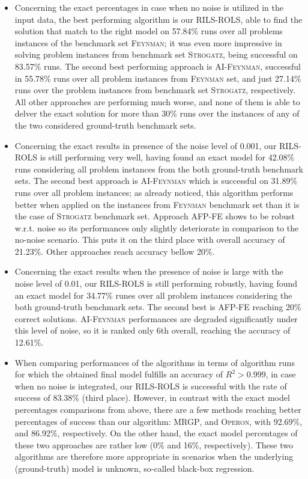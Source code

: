 \documentclass{bmcart}
\begin{document}
\begin{itemize}
	\item Concerning the exact percentages in case when no noise is utilized in the input data, the best performing algorithm is our \textsc{RILS-ROLS}, able to find the solution that match to the right model on 57.84\% runs over all problems instances of the benchmark set \textsc{Feynman}; it was even more impressive in solving problem instances from benchmark set \textsc{Strogatz}, being successful on 83.57\% runs. The second best performing  approach is \textsc{AI-Feynman}, successful in 55.78\%   runs over all problem instances from \textsc{Feynman} set, and just 27.14\% runs over the problem instances from benchmark set   \textsc{Strogatz}, respectively. All other approaches are performing much worse, and none of them is able to delver the exact solution for more than 30\% runs over the instances of any of the two considered ground-truth benchmark sets. 
	\item   Concerning the exact results in presence of the   noise  level of 0.001, our \textsc{RILS-ROLS} is still performing very well, having found an exact model for 42.08\% runs considering all problem instances from the both ground-truth benchmark sets. The second best approach is \textsc{AI-Feynman} which is successful on 31.89\% runs over all problem instances; as  already noticed, this algorithm performs better when applied on the instances from \textsc{Feynman} benchmark set than it is the case of \textsc{Strogatz} benchmark set. Approach  \textsc{AFP-FE} shows to be robust w.r.t. noise so its performances only slightly deteriorate in comparison to the no-noise scenario. This puts it on the third place with overall accuracy of 21.23\%. Other approaches reach   accuracy bellow 20\%. 
	\item  Concerning the exact results when the presence of noise is large with  the noise level of 0.01,  our \textsc{RILS-ROLS} is still performing robustly, having found an exact model for  34.77\% runes over all problem instances considering the both ground-truth benchmark sets. The second best is   \textsc{AFP-FE} reaching 20\% correct solutions. \textsc{AI-Feynman} performances are degraded significantly under this level of noise, so it is ranked only 6th overall, reaching the accuracy of 12.61\%.    
	
	\item When comparing performances of the algorithms in terms of algorithm runs for which the obtained final model fulfills an accuracy of $R^2 > 0.999$, in case when no noise is integrated, our \textsc{RILS}-\textsc{ROLS} is successful with the rate of success of 83.38\% (third place). However, in contrast with the exact model percentages comparisons from above, there are a few methods reaching   better percentages of success than our algorithm: \textsc{MRGP}, and \textsc{Operon}, with 92.69\%, and 86.92\%, respectively. On the other hand, the exact model percentages of these two approaches are rather low (0\% and 16\%, respectively). These two algorithms are therefore more appropriate in scenarios when the underlying (ground-truth) model is unknown, so-called black-box regression. 
	

\end{itemize}
\end{document}
